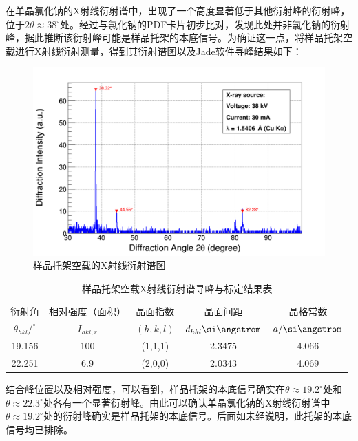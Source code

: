 \documentclass{thuemp}
\begin{document}
在单晶氯化钠的X射线衍射谱中，出现了一个高度显著低于其他衍射峰的衍射峰，位于$2\theta \approx 38^\circ$处。经过与氯化钠的PDF卡片初步比对，发现此处并非氯化钠的衍射峰，据此推断该衍射峰可能是样品托架的本底信号。为确证这一点，将样品托架空载进行X射线衍射测量，得到其衍射谱图以及Jade软件寻峰结果如下：

\begin{figure}[H]
    \centering
    \includegraphics[width=0.8\linewidth]{../Data/Background-from-manifold.png}
    \caption{样品托架空载的X射线衍射谱图}
    \label{fig:nacl_xrd_holder}
\end{figure}

\begin{table}[H]
    \centering
    \captionnamefont{\wuhao\bf\heiti}
    \captiontitlefont{\wuhao\bf\heiti}
    \caption{样品托架空载X射线衍射谱寻峰与标定结果表}
    \label{tab:nacl_xrd_holder}
    \liuhao
    \begin{tabular}{ccccc}
        \toprule
        衍射角 & 相对强度（面积）& 晶面指数 & 晶面间距 & 晶格常数 \\
        $\theta_{hkl}/^\circ$ & $I_{hkl,r}$ & $(h,k,l)$ & $d_{hkl}\text{\si\angstrom}$ & $a/\text{\si\angstrom}$\\
        \midrule
        19.156 & 100 & (1,1,1) & 2.3475 & 4.066 \\
        22.251 & 6.9 & (2,0,0) & 2.0343 & 4.069 \\
        \bottomrule
    \end{tabular}
\end{table}

结合峰位置以及相对强度，可以看到，样品托架的本底信号确实在$\theta \approx 19.2^\circ$处和$\theta \approx 22.3^\circ$处各有一个显著衍射峰。由此可以确认单晶氯化钠的X射线衍射谱中$\theta \approx 19.2^\circ$处的衍射峰确实是样品托架的本底信号。后面如未经说明，此托架的本底信号均已排除。
\end{document}

